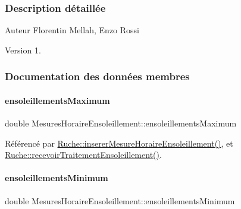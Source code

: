 \subsubsection{Description détaillée}
\begin{DoxyAuthor}{Auteur}
Florentin Mellah, Enzo Rossi
\end{DoxyAuthor}
\begin{DoxyVersion}{Version}
1. 
\end{DoxyVersion}


\subsubsection{Documentation des données membres}
\mbox{\label{struct_mesures_horaire_ensoleillement_adc848a942c5dcb0984b4c346f07e6f09}} 
\paragraph{\texorpdfstring{ensoleillements\+Maximum}{ensoleillementsMaximum}}
{\footnotesize\ttfamily double Mesures\+Horaire\+Ensoleillement\+::ensoleillements\+Maximum}



Référencé par \hyperlink{class_ruche_a658234b9d96541d204b95b74556742b6}{Ruche\+::inserer\+Mesure\+Horaire\+Ensoleillement()}, et \hyperlink{class_ruche_a2ac5766ce8652084f034c498691488ea}{Ruche\+::recevoir\+Traitement\+Ensoleillement()}.

\mbox{\label{struct_mesures_horaire_ensoleillement_a5d1165f40806663a3fd40ee4408c78f1}} 
\paragraph{\texorpdfstring{ensoleillements\+Minimum}{ensoleillementsMinimum}}
{\footnotesize\ttfamily double Mesures\+Horaire\+Ensoleillement\+::ensoleillements\+Minimum}



